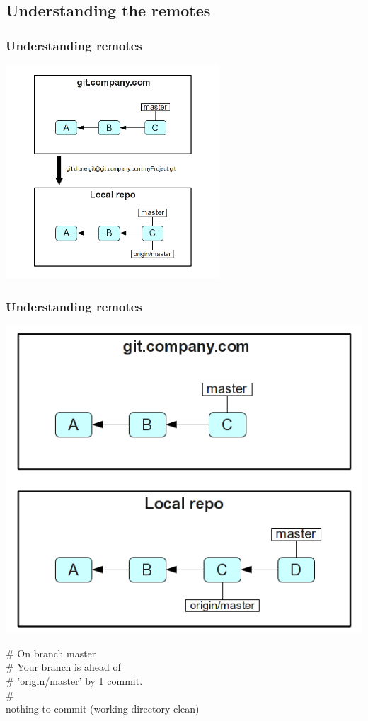 \documentclass{beamer}
\begin{document}
    \subsection{Understanding the remotes}

    \begin{frame}
        \frametitle{Understanding remotes}
        \begin{center}
            \includegraphics[width=0.6\textwidth]{figures/clone.png}
        \end{center}
    \end{frame}

    \begin{frame}
    \frametitle{Understanding remotes}
    \begin{minipage}{0.5\textwidth}
        \includegraphics[width=\textwidth]{figures/after-commit.png}
    \end{minipage}
    \begin{minipage}{0.4\textwidth}
    \footnotesize
\# On branch master\\
\# Your branch is ahead of\\
\# 'origin/master' by 1 commit.\\
\# \\
nothing to commit (working directory clean)
    \end{minipage}
    \end{frame}
\end{document}
